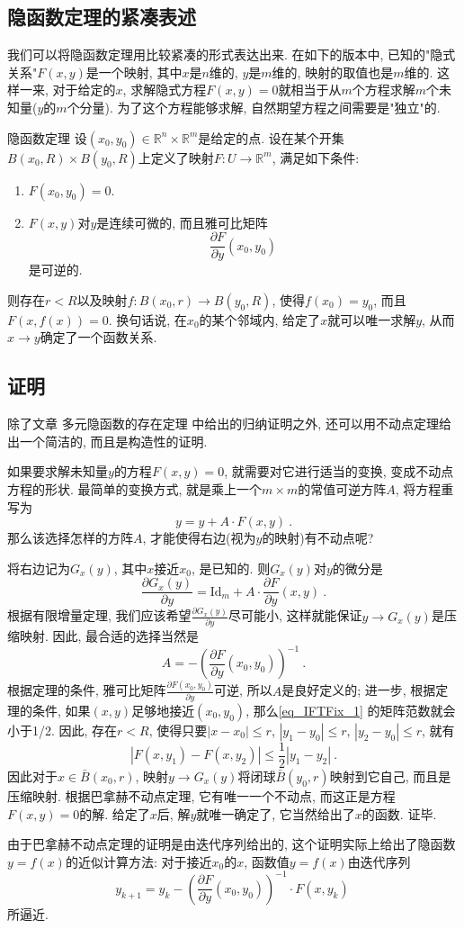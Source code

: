 

\subsection{隐函数定理的紧凑表述}
我们可以将隐函数定理用比较紧凑的形式表达出来. 在如下的版本中, 已知的"隐式关系"$F(x,y)$是一个映射, 其中$x$是$n$维的, $y$是$m$维的, 映射的取值也是$m$维的. 这样一来, 对于给定的$x$, 求解隐式方程$F(x,y)=0$就相当于从$m$个方程求解$m$个未知量($y$的$m$个分量). 为了这个方程能够求解, 自然期望方程之间需要是"独立"的.
\begin{theorem}{隐函数定理}
设$(x_0,y_0)\in\mathbb{R}^n\times\mathbb{R}^m$是给定的点. 设在某个开集$B(x_0,R)\times B(y_0,R)$上定义了映射$F:U\to\mathbb{R}^m$, 满足如下条件:
\begin{enumerate}
\item $F(x_0,y_0)=0$.
\item $F(x,y)$对$y$是连续可微的, 而且雅可比矩阵
$$
\frac{\partial F}{\partial y}(x_0,y_0)~
$$
是可逆的.
\end{enumerate}
则存在$r<R$以及映射$f:B(x_0,r)\to B(y_0,R)$, 使得$f(x_0)=y_0$, 而且$F(x,f(x))=0$. 换句话说, 在$x_0$的某个邻域内, 给定了$x$就可以唯一求解$y$, 从而$x\to y$确定了一个函数关系.
\end{theorem}

\subsection{证明}
除了文章 多元隐函数的存在定理 中给出的归纳证明之外, 还可以用不动点定理给出一个简洁的, 而且是构造性的证明.

如果要求解未知量$y$的方程$F(x,y)=0$, 就需要对它进行适当的变换, 变成不动点方程的形状. 最简单的变换方式, 就是乘上一个$m\times m$的常值可逆方阵$A$, 将方程重写为
$$
y=y+A\cdot F(x,y)~.
$$
那么该选择怎样的方阵$A$, 才能使得右边(视为$y$的映射)有不动点呢?

将右边记为$G_x(y)$, 其中$x$接近$x_0$, 是已知的. 则$G_x(y)$对$y$的微分是
\begin{equation}\label{eq_IFTFix_1}
\frac{\partial G_x(y)}{\partial y}=\mathrm{Id}_m+A\cdot\frac{\partial F}{\partial y}(x,y)~.
\end{equation}
根据有限增量定理, 我们应该希望$\frac{\partial G_x(y)}{\partial y}$尽可能小, 这样就能保证$y\to G_x(y)$是压缩映射. 因此, 最合适的选择当然是
$$
A=-\left(\frac{\partial F}{\partial y}(x_0,y_0)\right)^{-1}~.
$$
根据定理的条件, 雅可比矩阵$\frac{\partial F(x_0,y_0)}{\partial y}$可逆, 所以$A$是良好定义的; 进一步, 根据定理的条件, 如果$(x,y)$足够地接近$(x_0,y_0)$, 那么\autoref{eq_IFTFix_1} 的矩阵范数就会小于1/2. 因此, 存在$r<R$, 使得只要$|x-x_0|\leq r$, $|y_1-y_0|\leq r$, $|y_2-y_0|\leq r$, 就有
$$
|F(x,y_1)-F(x,y_2)|\leq\frac{1}{2}|y_1-y_2|~.
$$  
因此对于$x\in \bar B(x_0,r)$, 映射$y\to G_x(y)$将闭球$\bar B(y_0,r)$映射到它自己, 而且是压缩映射. 根据巴拿赫不动点定理, 它有唯一一个不动点, 而这正是方程$F(x,y)=0$的解. 给定了$x$后, 解$y$就唯一确定了, 它当然给出了$x$的函数. 证毕.

由于巴拿赫不动点定理的证明是由迭代序列给出的, 这个证明实际上给出了隐函数$y=f(x)$的近似计算方法: 对于接近$x_0$的$x$, 函数值$y=f(x)$由迭代序列
$$
y_{k+1}=y_k-\left(\frac{\partial F}{\partial y}(x_0,y_0)\right)^{-1}\cdot F(x,y_k)~
$$
所逼近.
